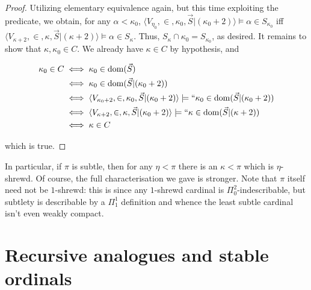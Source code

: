 \documentclass{article}
\theoremstyle{definition}
\theoremstyle{plain}
\theoremstyle{plain}
\theoremstyle{plain}
\theoremstyle{plain}
\theoremstyle{remark}
\theoremstyle{remark}
\theoremstyle{remark}
\theoremstyle{plain}
\theoremstyle{plain}
\theoremstyle{plain}
\begin{document}
\begin{proof}
Utilizing elementary equivalence again, but this time exploiting the predicate, we obtain, for any $\alpha < \kappa_0$, $\langle V_{\eta_0}, \in, \kappa_0, \vec{S}|(\kappa_0 + 2) \rangle \models \alpha \in S_{\kappa_0}$ iff $\langle V_{\kappa+2}, \in, \kappa, \vec{S}|(\kappa + 2) \rangle \models \alpha \in S_\kappa$. Thus, $S_\kappa \cap \kappa_0 = S_{\kappa_0}$, as desired. It remains to show that $\kappa, \kappa_0 \in C$. We already have $\kappa \in C$ by hypothesis, and

\begin{equation}
\begin{split}
\kappa_0 \in C & \iff \kappa_0 \in \operatorname{dom}(\vec{S}) \\ & \iff \kappa_0 \in \operatorname{dom}(\vec{S}|(\kappa_0 + 2)) \\ & \iff \langle V_{\kappa_0 + 2}, \in, \kappa_0, \vec{S}|(\kappa_0 + 2) \rangle \models ``\kappa_0 \in \operatorname{dom}(\vec{S}|(\kappa_0 + 2)) \\ & \iff \langle V_{\kappa + 2}, \in, \kappa, \vec{S}|(\kappa_0 + 2) \rangle \models ``\kappa \in \operatorname{dom}(\vec{S}|(\kappa + 2)) \\ & \iff \kappa \in C
\end{split}
\end{equation}

which is true.
\end{proof}

In particular, if $\pi$ is subtle, then for any $\eta < \pi$ there is an $\kappa < \pi$ which is $\eta$-shrewd. Of course, the full characterisation we gave is stronger. Note that $\pi$ itself need not be $1$-shrewd: this is since any $1$-shrewd cardinal is $\Pi^2_0$-indescribable, but subtlety is describable by a $\Pi^1_1$ definition and whence the least subtle cardinal isn't even weakly compact.

\section{Recursive analogues and stable ordinals}
\end{document}
